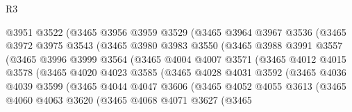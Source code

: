 \begin{lexlean}{R3}
\begin{coremodule}
                    @3951
                    @3522
                    (@3465
                      @3956
                      @3959
                      @3529
                      (@3465
                        @3964
                        @3967
                        @3536
                        (@3465
                          @3972
                          @3975
                          @3543
                          (@3465
                            @3980
                            @3983
                            @3550
                            (@3465
                              @3988
                              @3991
                              @3557
                              (@3465
                                @3996
                                @3999
                                @3564
                                (@3465
                                  @4004
                                  @4007
                                  @3571
                                  (@3465
                                    @4012
                                    @4015
                                    @3578
                                    (@3465
                                      @4020
                                      @4023
                                      @3585
                                      (@3465
                                        @4028
                                        @4031
                                        @3592
                                        (@3465
                                          @4036
                                          @4039
                                          @3599
                                          (@3465
                                            @4044
                                            @4047
                                            @3606
                                            (@3465
                                              @4052
                                              @4055
                                              @3613
                                              (@3465
                                                @4060
                                                @4063
                                                @3620
                                                (@3465
                                                  @4068
                                                  @4071
                                                  @3627
                                                  (@3465

\end{coremodule}
\end{lexlean}
